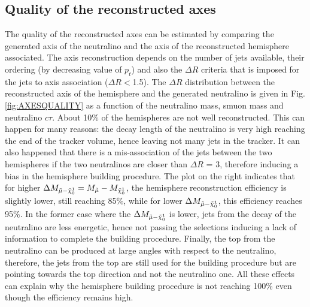 \documentclass{cernatlasnote}
\begin{document}
\subsection{Quality of the reconstructed axes}

The quality of the reconstructed axes can be estimated by comparing the generated axis of the neutralino and the axis of the reconstructed hemisphere associated. The axis reconstruction depends on the number of jets available, their ordering (by decreasing value of $p_t$) and also the $\Delta R$ criteria that is imposed for the jets to axis association ($\Delta R <$1.5).
The $\Delta R$ distribution between the reconstructed axis of the hemisphere and the generated neutralino is given in Fig. \ref{fig:AXESQUALITY} as a function of the neutralino mass, smuon mass and neutralino $c\tau$. About 10\% of the hemispheres are not well reconstructed. This can happen for many reasons: the decay length of the neutralino is very high reaching the end of the tracker volume, hence leaving not many jets in the tracker. It can also happened that there is a mis-association of the jets between the two hemispheres if the two neutralinos are closer than $\Delta R $ = 3, therefore inducing a bias in the hemisphere building procedure. The plot on the right indicates that for higher $\Delta M_{\Tilde{\mu}-\Tilde{\chi}^{1}_{0}} = M_{\Tilde{\mu}} - M_{\Tilde{\chi}^{1}_{0}}$, the hemisphere reconstruction efficiency is slightly lower, still reaching 85\%, while for lower $\Delta M_{\Tilde{\mu}-\Tilde{\chi}^{1}_{0}}$, this efficiency reaches 95\%. In the former case where the $\Delta M_{\Tilde{\mu}-\Tilde{\chi}^{1}_{0}}$ is lower, jets from the decay of the neutralino are less energetic, hence not passing the selections inducing a lack of information to complete the building procedure. Finally, the top from the neutralino can be produced at large angles with respect to the neutralino, therefore, the jets from the top are still used for the building procedure but are pointing towards the top direction and not the neutralino one. All these effects can explain why the hemisphere building procedure is not reaching 100\% even though the efficiency remains high.
\end{document}
